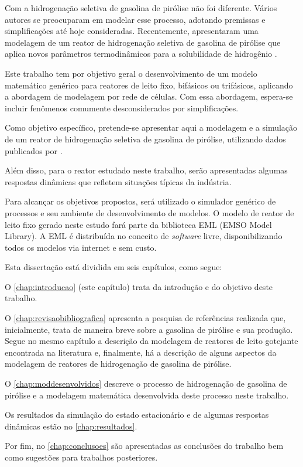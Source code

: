 Com a hidrogenação seletiva de gasolina de pirólise não
foi diferente. Vários autores se preocuparam em modelar esse
processo, adotando premissas e simplificações até hoje consideradas.
Recentemente,  apresentaram uma modelagem de
um reator de hidrogenação seletiva de gasolina de pirólise que aplica novos
parâmetros termodinâmicos para a solubilidade de hidrogênio \cite{Rojas2014}. 

Este trabalho tem por objetivo geral o desenvolvimento de um modelo
matemático genérico para reatores de leito fixo, bifásicos ou trifásicos,
aplicando a abordagem de modelagem por rede de células. Com essa
abordagem, espera-se incluir fenômenos comumente desconsiderados por
simplificações.

Como objetivo específico, pretende-se apresentar aqui a modelagem e a
simulação de um reator de hidrogenação seletiva de gasolina de pirólise,
utilizando dados publicados por .

Além disso, para o reator estudado neste trabalho, serão
apresentadas algumas respostas dinâmicas que refletem situações típicas da
indústria.

Para alcançar os objetivos propostos, será utilizado o simulador genérico de
processos \emso{} \cite{Soares2003} e seu ambiente de desenvolvimento de
modelos. O modelo de reator de leito fixo gerado neste estudo fará parte da
biblioteca EML (EMSO Model Library). A EML é distribuída no conceito de
\emph{software} livre, disponibilizando todos os modelos via internet e sem custo.

Esta dissertação está dividida em seis capítulos, como segue:

O \autoref{chap:introducao} (este capítulo) trata da introdução e do objetivo
deste trabalho.

O \autoref{chap:revisaobibliografica} apresenta a pesquisa de referências
realizada que, inicialmente, trata de maneira breve sobre a gasolina de pirólise
e sua produção. Segue no mesmo capítulo a descrição da modelagem de reatores de
leito gotejante encontrada na literatura e, finalmente, há a descrição de alguns
aspectos da modelagem de reatores de hidrogenação de gasolina de pirólise.

O \autoref{chap:moddesenvolvidos} descreve o processo de
hidrogenação de gasolina de pirólise e a modelagem matemática
desenvolvida deste processo neste trabalho.

Os resultados da simulação do estado estacionário e de algumas
respostas dinâmicas estão no \autoref{chap:resultados}.

Por fim, no \autoref{chap:conclusoes} são apresentadas as conclusões do
trabalho bem como sugestões para trabalhos posteriores.
